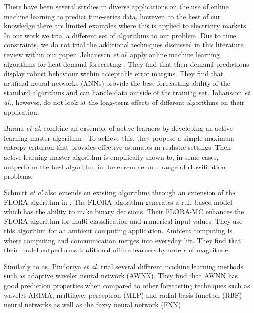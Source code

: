 \documentclass[final,3p,times,twocolumn,numbers]{elsarticle}
\begin{document}
There have been several studies in diverse applications on the use of online machine learning to predict time-series data, however, to the best of our knowledge there are limited examples where this is applied to electricity markets. In our work we trial a different set of algorithms to our problem. Due to time constraints, we do not trial the additional techniques discussed in this literature review within our paper. Johansson \textit{et al}. apply online machine learning algorithms for heat demand forecasting \cite{Johansson2017}. They find that their demand predictions display robust behaviour within acceptable error margins. They find that artificial neural networks (ANNs) provide the best forecasting ability of the standard algorithms and can handle data outside of the training set. Johansson \textit{et al.}, however, do not look at the long-term effects of different algorithms on their application.

Baram \textit{et al.} combine an ensemble of active learners by developing an active-learning master algorithm \cite{Baram2003}. To achieve this, they propose a simple maximum entropy criterion that provides effective estimates in realistic settings. Their active-learning master algorithm is empirically shown to, in some cases, outperform the best algorithm in the ensemble on a range of classification problems.

Schmitt \textit{et al} also extends on existing algorithms through an extension of the FLORA algorithm in \cite{Schmitt2008, Widmer1996}. The FLORA algorithm generates a rule-based model, which has the ability to make binary decisions. Their FLORA-MC enhances the FLORA algorithm for multi-classification and numerical input values. They use this algorithm for an ambient computing application. Ambient computing is where computing and communication merges into everyday life. They find that their model outperforms traditional offline learners by orders of magnitude.

Similarly to us, Pindoriya \textit{et al}. trial several different machine learning methods such as adaptive wavelet neural network (AWNN). They find that AWNN has good prediction properties when compared to other forecasting techniques such as wavelet-ARIMA, multilayer perceptron (MLP) and radial basis function (RBF) neural networks as well as the fuzzy neural network (FNN).
\end{document}
